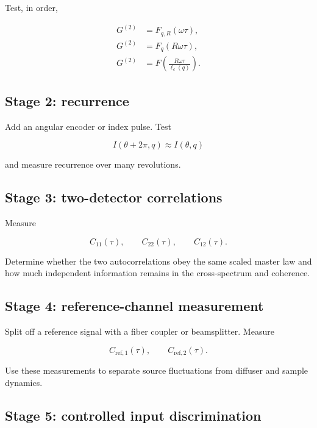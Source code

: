 \documentclass[11pt,letterpaper]{article}
\newcommand{\Gnorm}{G^{(2)}}
\begin{document}
Test, in order,

\begin{align}
    \Gnorm &= F_{q,R}(\omega\tau),\\
    \Gnorm &= F_q(R\omega\tau),\\
    \Gnorm &= F\left(
    \frac{R\omega\tau}{\ell_c(q)}
    \right).
\end{align}

\subsection{Stage 2: recurrence}

Add an angular encoder or index pulse. Test

\begin{equation}
    I(\theta+2\pi,q)\approx I(\theta,q)
\end{equation}

and measure recurrence over many revolutions.

\subsection{Stage 3: two-detector correlations}

Measure

\begin{equation}
    C_{11}(\tau),
    \qquad
    C_{22}(\tau),
    \qquad
    C_{12}(\tau).
\end{equation}

Determine whether the two autocorrelations obey the same scaled master law
and how much independent information remains in the cross-spectrum and
coherence.

\subsection{Stage 4: reference-channel measurement}

Split off a reference signal with a fiber coupler or beamsplitter. Measure

\begin{equation}
    C_{\mathrm{ref},1}(\tau),
    \qquad
    C_{\mathrm{ref},2}(\tau).
\end{equation}

Use these measurements to separate source fluctuations from diffuser and
sample dynamics.

\subsection{Stage 5: controlled input discrimination}
\end{document}
